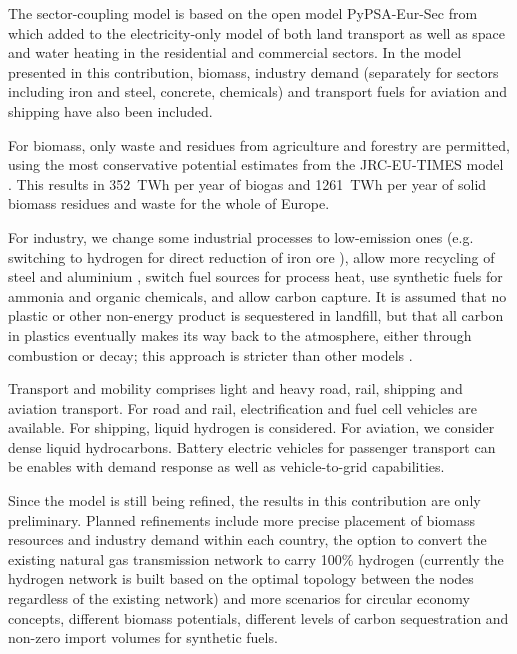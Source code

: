 The sector-coupling model is based on the open model PyPSA-Eur-Sec from
\cite{brownSynergiesSector2018} which added to the electricity-only model of
\cite{schlachtbergerBenefitsCooperation2017} both land transport as well as space and water heating
in the residential and commercial sectors. In the model presented in this
contribution, biomass, industry demand (separately for sectors including iron
and steel, concrete, chemicals) and transport fuels for aviation and shipping
have also been included.

For biomass, only waste and residues from agriculture and forestry are
permitted, using the most conservative potential estimates from the JRC-EU-TIMES
model \cite{jrcbiomass2015}. This results in 352~TWh per year of biogas and
1261~TWh per year of solid biomass residues and waste for the whole of Europe.

For industry, we change some industrial processes to low-emission ones (e.g.
switching to hydrogen for direct reduction of iron ore \cite{voglAssessmentHydrogen2018}), allow
more recycling of steel and aluminium \cite{circular_economy}, switch fuel
sources for process heat, use synthetic fuels for ammonia and organic chemicals,
and allow carbon capture. It is assumed that no plastic or other non-energy
product is sequestered in landfill, but that all carbon in plastics eventually
makes its way back to the atmosphere, either through combustion or decay; this
approach is stricter than other models \cite{in-depth_2018}.

Transport and mobility comprises light and heavy road, rail, shipping and
aviation transport. For road and rail, electrification and fuel cell vehicles are
available. For shipping, liquid hydrogen is considered. For aviation, we
consider dense liquid hydrocarbons. Battery electric vehicles for passenger
transport can be enables with demand response as well as vehicle-to-grid
capabilities.

Since the model is still being refined, the results in this contribution are
only preliminary. Planned refinements include more precise placement of biomass
resources and industry demand within each country, the option to convert the
existing natural gas transmission network to carry 100\% hydrogen (currently the
hydrogen network is built based on the optimal topology between the nodes
regardless of the existing network) and more scenarios for circular economy
concepts, different biomass potentials, different levels of carbon sequestration
and non-zero import volumes for synthetic fuels.